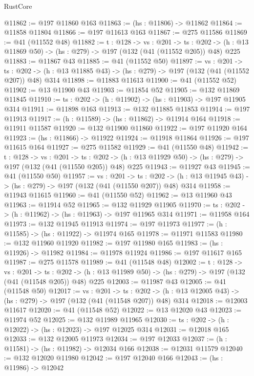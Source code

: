 \begin{lexlean}{RustCore}
\begin{coremodule}
@11862 := @197 @11860 @163
@11863 := (hs : @11806) -> @11862
@11864 := @11858 @11804
@11866 := @197 @11613 @163
@11867 := @275 @11586
@11869 := @41 (@11552 @48)
@11882 := {t : @128} ->
  {vs : @201} ->
  {ts : @202} -> (h : @13 @11869 @50) -> (hs : @279) -> @197 (@132 (@41 (@11552 @205)) @48) @225
@11883 := @11867 @43
@11885 := @41 (@11552 @50)
@11897 := {vs : @201} ->
  {ts : @202} -> (h : @13 @11885 @43) -> (hs : @279) -> @197 (@132 (@41 (@11552 @207)) @48) @314
@11898 := @11883 @11613
@11900 := @41 (@11552 @52)
@11902 := @13 @11900 @43
@11903 := @11854 @52
@11905 := @132 @11869 @11845
@11910 := {ts : @202} -> (h : @11902) -> (hs : @11903) -> @197 @11905 @314
@11911 := @11898 @163
@11913 := @132 @11885 @11853
@11914 := @197 @11913
@11917 := (h : @11589) -> (hs : @11862) -> @11914 @164
@11918 := @11911 @11587
@11920 := @132 @11900 @11860
@11922 := @197 @11920 @164
@11923 := (hs : @11866) -> @11922
@11924 := @11918 @11864
@11926 := @197 @11615 @164
@11927 := @275 @11582
@11929 := @41 (@11550 @48)
@11942 := {t : @128} ->
  {vs : @201} ->
  {ts : @202} -> (h : @13 @11929 @50) -> (hs : @279) -> @197 (@132 (@41 (@11550 @205)) @48) @225
@11943 := @11927 @43
@11945 := @41 (@11550 @50)
@11957 := {vs : @201} ->
  {ts : @202} -> (h : @13 @11945 @43) -> (hs : @279) -> @197 (@132 (@41 (@11550 @207)) @48) @314
@11958 := @11943 @11615
@11960 := @41 (@11550 @52)
@11962 := @13 @11960 @43
@11963 := @11914 @52
@11965 := @132 @11929 @11905
@11970 := {ts : @202} -> (h : @11962) -> (hs : @11963) -> @197 @11965 @314
@11971 := @11958 @164
@11973 := @132 @11945 @11913
@11974 := @197 @11973
@11977 := (h : @11585) -> (hs : @11922) -> @11974 @165
@11978 := @11971 @11583
@11980 := @132 @11960 @11920
@11982 := @197 @11980 @165
@11983 := (hs : @11926) -> @11982
@11984 := @11978 @11924
@11986 := @197 @11617 @165
@11987 := @275 @11578
@11989 := @41 (@11548 @48)
@12002 := {t : @128} ->
  {vs : @201} ->
  {ts : @202} -> (h : @13 @11989 @50) -> (hs : @279) -> @197 (@132 (@41 (@11548 @205)) @48) @225
@12003 := @11987 @43
@12005 := @41 (@11548 @50)
@12017 := {vs : @201} ->
  {ts : @202} -> (h : @13 @12005 @43) -> (hs : @279) -> @197 (@132 (@41 (@11548 @207)) @48) @314
@12018 := @12003 @11617
@12020 := @41 (@11548 @52)
@12022 := @13 @12020 @43
@12023 := @11974 @52
@12025 := @132 @11989 @11965
@12030 := {ts : @202} -> (h : @12022) -> (hs : @12023) -> @197 @12025 @314
@12031 := @12018 @165
@12033 := @132 @12005 @11973
@12034 := @197 @12033
@12037 := (h : @11581) -> (hs : @11982) -> @12034 @166
@12038 := @12031 @11579
@12040 := @132 @12020 @11980
@12042 := @197 @12040 @166
@12043 := (hs : @11986) -> @12042

\end{coremodule}
\end{lexlean}
